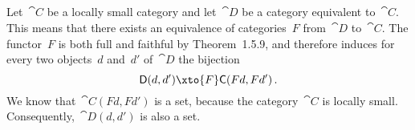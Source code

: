 \subsection{}

Let~$\cat{C}$ be a locally small category and let~$\cat{D}$ be a category equivalent to~$\cat{C}$.
This means that there exists an equivalence of categories~$F$ from~$\cat{D}$ to~$\cat{C}$.
The functor~$F$ is both full and faithful by Theorem~1.5.9, and therefore induces for every two objects~$d$ and~$d'$ of~$\cat{D}$ the bijection
\[
	\cat{D}(d, d') \xto{F} \cat{C}(F d, F d') \,.
\]
We know that~$\cat{C}(F d, F d')$ is a set, because the category~$\cat{C}$ is locally small.
Consequently,~$\cat{D}(d, d')$ is also a set.
